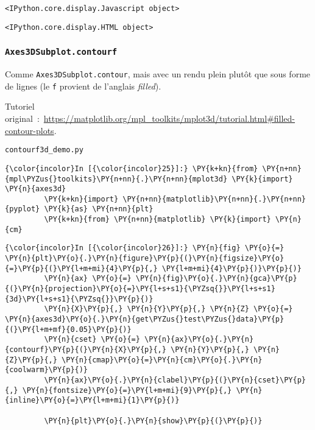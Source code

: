     
    \begin{verbatim}
<IPython.core.display.Javascript object>
    \end{verbatim}

    
    
    \begin{verbatim}
<IPython.core.display.HTML object>
    \end{verbatim}

    
    \hypertarget{axes3dsubplot.contourf}{%
\subsubsection{\texorpdfstring{\texttt{Axes3DSubplot.contourf}}{Axes3DSubplot.contourf}}\label{axes3dsubplot.contourf}}

    Comme \texttt{Axes3DSubplot.contour}, mais avec un rendu plein plutôt
que sous forme de lignes (le \texttt{f} provient de l'anglais
\emph{filled}).

    Tutoriel
original~:~\url{https://matplotlib.org/mpl_toolkits/mplot3d/tutorial.html\#filled-contour-plots}.

    \texttt{contourf3d\_demo.py}

    \begin{Verbatim}[commandchars=\\\{\},frame=single,framerule=0.3mm,rulecolor=\color{cellframecolor}]
{\color{incolor}In [{\color{incolor}25}]:} \PY{k+kn}{from} \PY{n+nn}{mpl\PYZus{}toolkits}\PY{n+nn}{.}\PY{n+nn}{mplot3d} \PY{k}{import} \PY{n}{axes3d}
         \PY{k+kn}{import} \PY{n+nn}{matplotlib}\PY{n+nn}{.}\PY{n+nn}{pyplot} \PY{k}{as} \PY{n+nn}{plt}
         \PY{k+kn}{from} \PY{n+nn}{matplotlib} \PY{k}{import} \PY{n}{cm}
\end{Verbatim}


    \begin{Verbatim}[commandchars=\\\{\},frame=single,framerule=0.3mm,rulecolor=\color{cellframecolor}]
{\color{incolor}In [{\color{incolor}26}]:} \PY{n}{fig} \PY{o}{=} \PY{n}{plt}\PY{o}{.}\PY{n}{figure}\PY{p}{(}\PY{n}{figsize}\PY{o}{=}\PY{p}{(}\PY{l+m+mi}{4}\PY{p}{,} \PY{l+m+mi}{4}\PY{p}{)}\PY{p}{)}
         \PY{n}{ax} \PY{o}{=} \PY{n}{fig}\PY{o}{.}\PY{n}{gca}\PY{p}{(}\PY{n}{projection}\PY{o}{=}\PY{l+s+s1}{\PYZsq{}}\PY{l+s+s1}{3d}\PY{l+s+s1}{\PYZsq{}}\PY{p}{)}
         \PY{n}{X}\PY{p}{,} \PY{n}{Y}\PY{p}{,} \PY{n}{Z} \PY{o}{=} \PY{n}{axes3d}\PY{o}{.}\PY{n}{get\PYZus{}test\PYZus{}data}\PY{p}{(}\PY{l+m+mf}{0.05}\PY{p}{)}
         \PY{n}{cset} \PY{o}{=} \PY{n}{ax}\PY{o}{.}\PY{n}{contourf}\PY{p}{(}\PY{n}{X}\PY{p}{,} \PY{n}{Y}\PY{p}{,} \PY{n}{Z}\PY{p}{,} \PY{n}{cmap}\PY{o}{=}\PY{n}{cm}\PY{o}{.}\PY{n}{coolwarm}\PY{p}{)}
         \PY{n}{ax}\PY{o}{.}\PY{n}{clabel}\PY{p}{(}\PY{n}{cset}\PY{p}{,} \PY{n}{fontsize}\PY{o}{=}\PY{l+m+mi}{9}\PY{p}{,} \PY{n}{inline}\PY{o}{=}\PY{l+m+mi}{1}\PY{p}{)}
         
         \PY{n}{plt}\PY{o}{.}\PY{n}{show}\PY{p}{(}\PY{p}{)}
\end{Verbatim}


